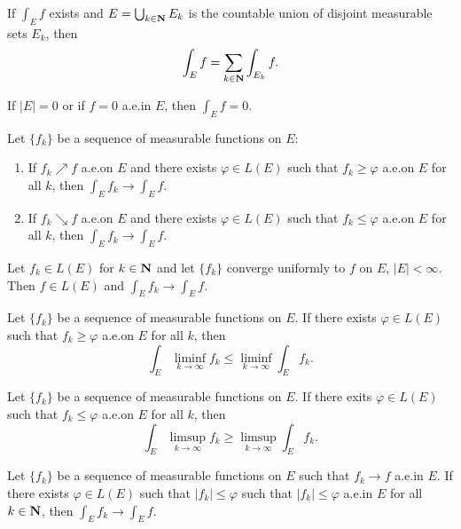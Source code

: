 \begin{theorem*}[5.24]
If $\int_E f$ exists and $E=\bigcup_{k\in\mathbf{N}} E_k$ is the countable union
of disjoint measurable sets $E_k$, then
\[
\int_E f=\sum_{k\in\mathbf{N}}\int_{E_k}f.
\]
\end{theorem*}
\begin{theorem*}[5.25]
If $|E|=0$ or if $f=0$ a.e.\@ in $E$, then $\int_E f=0$.
\end{theorem*}
\begin{theorem*}
Let $\{f_k\}$ be a sequence of measurable functions on $E$:
\begin{enumerate}[label=\textnormal{(\roman*)}]
\item If $f_k\nearrow f$ a.e.\@ on $E$ and there exists $\varphi\in L(E)$ such
  that $f_k\geq\varphi$ a.e.\@ on $E$ for all $k$, then $\int_E
  f_k\to\int_E f$.
\item If $f_k\searrow f$ a.e.\@ on $E$ and there exists $\varphi\in L(E)$ such
  that $f_k\leq\varphi$ a.e.\@ on $E$ for all $k$, then $\int_E
  f_k\to\int_E f$.
\end{enumerate}
\end{theorem*}
\begin{theorem*}
Let $f_k\in L(E)$ for $k\in\mathbf{N}$ and let $\{f_k\}$ converge uniformly to
$f$ on $E$, $|E|<\infty$. Then $f\in L(E)$ and $\int_E f_k\to\int_E f$.
\end{theorem*}
\begin{theorem*}
Let $\{f_k\}$ be a sequence of measurable functions on $E$. If there exists
$\varphi\in L(E)$ such that $f_k\geq\varphi$ a.e.\@ on $E$ for all $k$,
then
\[
\int_E\liminf_{k\to\infty} f_k\leq\liminf_{k\to\infty}\int_E f_k.
\]
\end{theorem*}
\begin{corollary*}
Let $\{f_k\}$ be a sequence of measurable functions on $E$. If there exits
$\varphi\in L(E)$ such that $f_k\leq\varphi$ a.e.\@ on $E$ for all $k$,
then
\[
\int_E\limsup_{k\to\infty} f_k\geq\limsup_{k\to\infty}\int_E f_k.
\]
\end{corollary*}
\begin{theorem*}
Let $\{f_k\}$ be a sequence of measurable functions on $E$ such that
$f_k\to f$ a.e.\@ in $E$. If there exists $\varphi\in L(E)$ such that
$|f_k|\leq\varphi$  such that $|f_k|\leq\varphi$ a.e.\@ in $E$ for all
$k\in\mathbf{N}$, then $\int_E f_k\to\int_E f$.
\end{theorem*}
